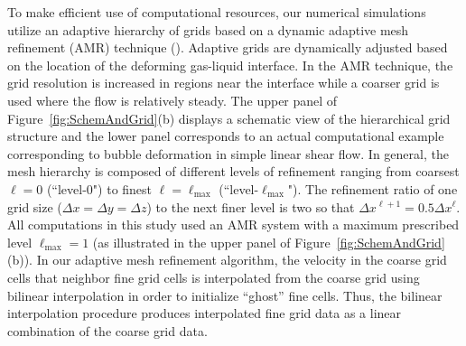 \documentclass{elsarticle}
\begin{document}
To make efficient use of computational resources, our numerical simulations utilize an adaptive hierarchy of grids based on a dynamic adaptive mesh refinement (AMR) technique (\citet{SusAlmBelColHowWel99}).  Adaptive grids are dynamically adjusted based on the location of the deforming gas-liquid interface.  In the AMR technique, the grid resolution is increased in regions near the interface while a coarser grid is used where the flow is relatively steady.  The upper panel of Figure~\ref{fig:SchemAndGrid}(b) displays a schematic view of the hierarchical grid structure and the lower panel corresponds to an actual computational example corresponding to bubble deformation in simple linear shear flow.  In general, the mesh hierarchy is composed of different levels of refinement ranging from coarsest $\ell=0$ (``level-0") to finest $\ell=\ell_{\textrm{max}}$ (``level-$\ell_{\textrm{max}}$").  The refinement ratio of one grid size ($\Delta x=\Delta y=\Delta z$) to the next finer level is two so that $\Delta x^{\ell+1}=0.5\Delta x^{\ell}$.  All computations in this study used an AMR system with a maximum prescribed level $\ell_{\textrm{max}} = 1$ (as illustrated in the upper panel of Figure~\ref{fig:SchemAndGrid}(b)).  In our adaptive mesh refinement algorithm, the velocity in the coarse grid cells that neighbor fine grid cells is interpolated from the coarse grid using bilinear interpolation in order to initialize ``ghost'' fine cells. Thus, the bilinear interpolation procedure produces interpolated fine grid data as a linear combination of the coarse grid data.  
\end{document}
